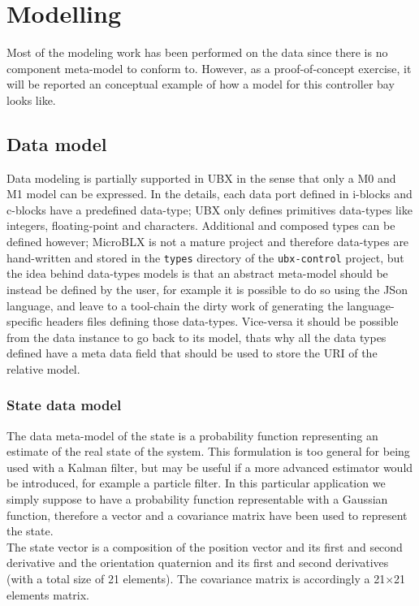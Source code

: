 \chapter{Modelling} \label{ch:model} 
Most of the modeling work has been performed on the data since there is no component meta-model to conform to. However, as a proof-of-concept exercise, it will be reported an conceptual example of how a model for this controller bay looks like.

\section{Data model}
Data modeling is partially supported in UBX in the sense that only a M0 and M1 model can be expressed. In the details, each data port defined in i-blocks and c-blocks have a predefined data-type; UBX only defines primitives data-types like integers, floating-point and characters. Additional and composed types can be defined however; MicroBLX is not a mature project and therefore data-types are hand-written and stored in the \texttt{types} directory of the \texttt{ubx-control} project, but the idea behind data-types models is that an abstract meta-model should be instead be defined by the user, for example it is possible to do so using the JSon language, and leave to a tool-chain the dirty work of generating the language-specific headers files defining those data-types. Vice-versa it should be possible from the data instance to go back to its model, thats why all the data types defined have a meta data field that should be used to store the URI of the relative model.

\subsection{State data model}
The data meta-model of the state is a probability function representing an estimate of the real state of the system. This formulation is too general for being used with a Kalman filter, but may be useful if a more advanced estimator would be introduced, for example a particle filter. In this particular application we simply suppose to have a probability function representable with a Gaussian function, therefore a vector and a covariance matrix have been used to represent the state.\\
The state vector is a composition of the position vector and its first and second derivative and the orientation quaternion and its first and second derivatives (with a total size of 21 elements). The covariance matrix is accordingly a 21$\times$21 elements matrix.

